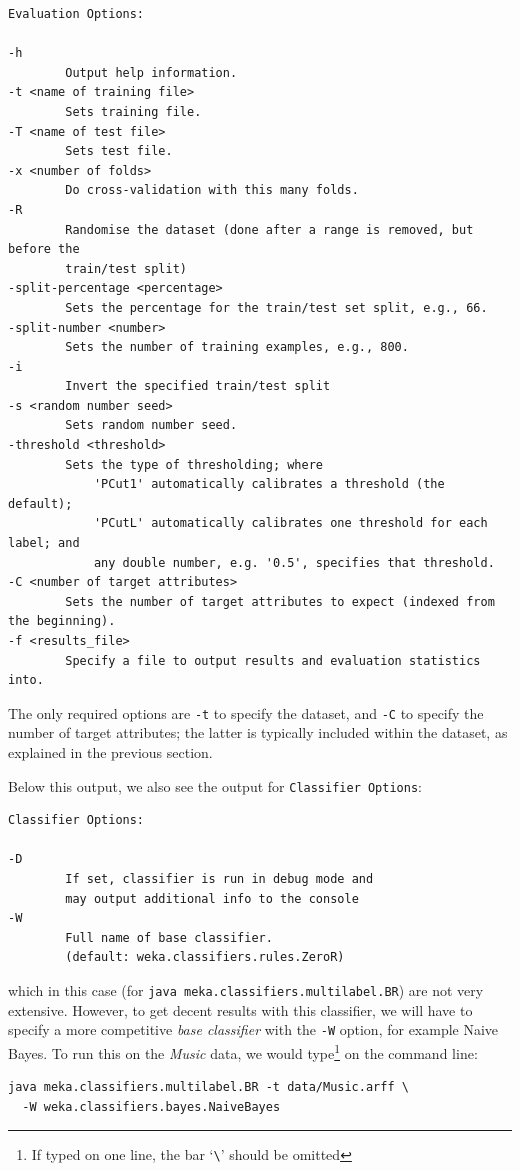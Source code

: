 \documentclass[11pt]{article}
\begin{document}
{\small
\begin{lstlisting}
Evaluation Options:

-h
        Output help information.
-t <name of training file>
        Sets training file.
-T <name of test file>
        Sets test file.
-x <number of folds>
        Do cross-validation with this many folds.
-R
        Randomise the dataset (done after a range is removed, but before the 
        train/test split)
-split-percentage <percentage>
        Sets the percentage for the train/test set split, e.g., 66.
-split-number <number>
        Sets the number of training examples, e.g., 800.
-i
        Invert the specified train/test split
-s <random number seed>
        Sets random number seed.
-threshold <threshold>
        Sets the type of thresholding; where 
            'PCut1' automatically calibrates a threshold (the default); 
            'PCutL' automatically calibrates one threshold for each label; and 
            any double number, e.g. '0.5', specifies that threshold.
-C <number of target attributes>
        Sets the number of target attributes to expect (indexed from the beginning).
-f <results_file>
        Specify a file to output results and evaluation statistics into.
\end{lstlisting}
}

The only required options are \texttt{-t} to specify the dataset, and \texttt{-C} to specify the number of target attributes; the latter is typically included within the dataset, as explained in the previous section. 

Below this output, we also see the output for \texttt{Classifier Options}:

{\small
\begin{lstlisting}
Classifier Options:

-D
        If set, classifier is run in debug mode and
        may output additional info to the console
-W
        Full name of base classifier.
        (default: weka.classifiers.rules.ZeroR)
\end{lstlisting}
}

which in this case (for \texttt{java meka.classifiers.multilabel.BR}) are not very extensive. However, to get decent results with this classifier, we will have to specify a more competitive \emph{base classifier} with the \texttt{-W} option, for example Naive Bayes. To run this on the \textit{Music} data, we would type\footnote{If typed on one line, the bar `\texttt{\textbackslash}' should be omitted} on the command line:

\begin{lstlisting}
java meka.classifiers.multilabel.BR -t data/Music.arff \
  -W weka.classifiers.bayes.NaiveBayes
\end{lstlisting}
\end{document}
